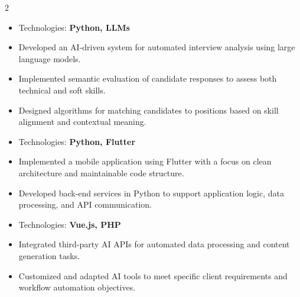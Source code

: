 \documentclass[10pt,a4paper,ragged2e,withhyper]{altacv}
\begin{document}
\begin{paracol}{2}





\divider


\divider







\begin{itemize}
    \item Technologies: \textbf{Python, LLMs}
    \item Developed an AI-driven system for automated interview analysis using large language models.
    \item Implemented semantic evaluation of candidate responses to assess both technical and soft skills.
    \item Designed algorithms for matching candidates to positions based on skill alignment and contextual meaning.
\end{itemize}
\divider

\begin{itemize}
    \item Technologies: \textbf{Python, Flutter}
    \item Implemented a mobile application using Flutter with a focus on clean architecture and maintainable code structure.
    \item Developed back-end services in Python to support application logic, data processing, and API communication.
\end{itemize}


\divider
{}
\begin{itemize}
    \item Technologies: \textbf{Vue.js, PHP}
    \item Integrated third-party AI APIs for automated data processing and content generation tasks.
    \item Customized and adapted AI tools to meet specific client requirements and workflow automation objectives.
\end{itemize}




\end{paracol}
\end{document}
